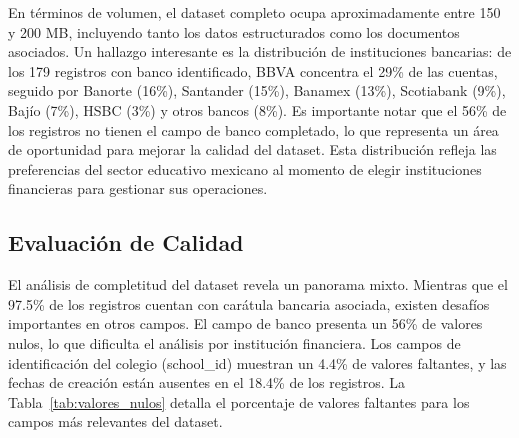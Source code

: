En términos de volumen, el dataset completo ocupa aproximadamente entre 150 y 200 MB, incluyendo tanto los datos estructurados como los documentos asociados. Un hallazgo interesante es la distribución de instituciones bancarias: de los 179 registros con banco identificado, BBVA concentra el 29\% de las cuentas, seguido por Banorte (16\%), Santander (15\%), Banamex (13\%), Scotiabank (9\%), Bajío (7\%), HSBC (3\%) y otros bancos (8\%). Es importante notar que el 56\% de los registros no tienen el campo de banco completado, lo que representa un área de oportunidad para mejorar la calidad del dataset. Esta distribución refleja las preferencias del sector educativo mexicano al momento de elegir instituciones financieras para gestionar sus operaciones.

\subsection{Evaluación de Calidad}

El análisis de completitud del dataset revela un panorama mixto. Mientras que el 97.5\% de los registros cuentan con carátula bancaria asociada, existen desafíos importantes en otros campos. El campo de banco presenta un 56\% de valores nulos, lo que dificulta el análisis por institución financiera. Los campos de identificación del colegio (school\_id) muestran un 4.4\% de valores faltantes, y las fechas de creación están ausentes en el 18.4\% de los registros. La Tabla~\ref{tab:valores_nulos} detalla el porcentaje de valores faltantes para los campos más relevantes del dataset.

